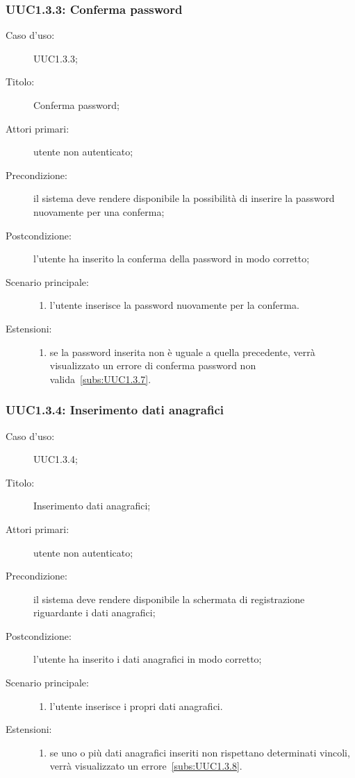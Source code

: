 \documentclass[../../../analisi-dei-requisiti.tex]{subfiles}
\begin{document}
\subsubsection{UUC1.3.3: Conferma password}%
\label{subs:UUC1.3.3}
\begin{description}
  \item[Caso d'uso:] UUC1.3.3;
  \item[Titolo:] Conferma password;
  \item[Attori primari:] utente non autenticato;
  \item[Precondizione:] il sistema deve rendere disponibile la possibilità di inserire la password nuovamente per una conferma;
  \item[Postcondizione:] l'utente ha inserito la conferma della password in modo corretto;
  \item[Scenario principale:]
        \begin{enumerate}
          \item l'utente inserisce la password nuovamente per la conferma.
        \end{enumerate}
  \item[Estensioni:]
        \begin{enumerate}
          \item se la password inserita non è uguale a quella precedente, verrà visualizzato un errore di conferma password non valida~\ref{subs:UUC1.3.7}.
        \end{enumerate}
\end{description}



\subsubsection{UUC1.3.4: Inserimento dati anagrafici}%
\label{subs:UUC1.3.4}
\begin{description}
  \item[Caso d'uso:] UUC1.3.4;
  \item[Titolo:] Inserimento dati anagrafici;
  \item[Attori primari:] utente non autenticato;
  \item[Precondizione:] il sistema deve rendere disponibile la schermata di registrazione riguardante i dati anagrafici;
  \item[Postcondizione:] l'utente ha inserito i dati anagrafici in modo corretto;
  \item[Scenario principale:]
        \begin{enumerate}
          \item l'utente inserisce i propri dati anagrafici.
        \end{enumerate}
  \item[Estensioni:]
        \begin{enumerate}
          \item se uno o più dati anagrafici inseriti non rispettano determinati vincoli, verrà visualizzato un errore~\ref{subs:UUC1.3.8}.
        \end{enumerate}
\end{description}
\end{document}
